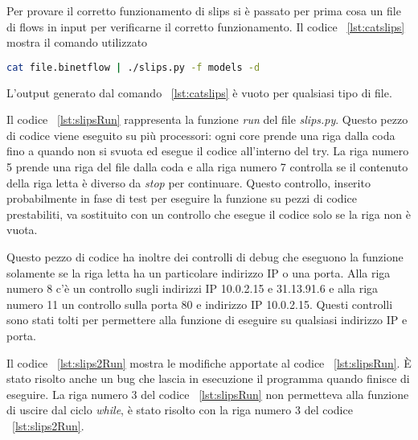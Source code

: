 \documentclass[../main.tex]{subfiles}
\begin{document}
Per provare il corretto funzionamento di slips si è passato per prima cosa un file di flows in input per verificarne il corretto funzionamento. Il codice ~\ref{lst:catslips} mostra il comando utilizzato 
\begin{lstlisting}[language=Bash, label={lst:catslips}, caption={comando per eseguire slips}]
cat file.binetflow | ./slips.py -f models -d
\end{lstlisting}
L'output generato dal comando ~\ref{lst:catslips} è vuoto per qualsiasi tipo di file.

Il codice ~\ref{lst:slipsRun} rappresenta la funzione \textit{run} del file \textit{slips.py}. Questo pezzo di codice viene eseguito su più processori: ogni core prende una riga dalla coda fino a quando non si svuota ed esegue il codice all'interno del try.
La riga numero 5 prende una riga del file dalla coda e alla riga numero 7 controlla se il contenuto della riga letta è diverso da \textit{stop} per continuare. Questo controllo, inserito probabilmente in fase di test per eseguire la funzione su pezzi di codice prestabiliti, va sostituito con un controllo che esegue il codice solo se la riga non è vuota.

Questo pezzo di codice ha inoltre dei controlli di debug che eseguono la funzione solamente se la riga letta ha un particolare indirizzo IP o una porta. Alla riga numero 8 c'è un controllo sugli indirizzi IP 10.0.2.15 e 31.13.91.6 e alla riga numero 11 un controllo sulla porta 80 e indirizzo IP 10.0.2.15. Questi controlli sono stati tolti per permettere alla funzione di eseguire su qualsiasi indirizzo IP e porta.



Il codice ~\ref{lst:slips2Run} mostra le modifiche apportate al codice ~\ref{lst:slipsRun}. È stato risolto anche un bug che lascia in esecuzione il programma quando finisce di eseguire. La riga numero 3 del codice ~\ref{lst:slipsRun} non permetteva alla funzione di uscire dal ciclo \textit{while}, è stato risolto con la riga numero 3 del codice ~\ref{lst:slips2Run}.


\end{document}
